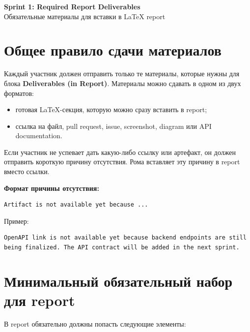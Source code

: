 \documentclass[12pt,a4paper]{article}
\begin{document}

\begin{center}
    {\LARGE \textbf{Sprint 1: Required Report Deliverables}}\\[6pt]
    {\large Обязательные материалы для вставки в LaTeX report}
\end{center}

\section{Общее правило сдачи материалов}

Каждый участник должен отправить только те материалы, которые нужны для блока \textbf{Deliverables (in Report)}.
Материалы можно сдавать в одном из двух форматов:

\begin{itemize}
    \item готовая LaTeX-секция, которую можно сразу вставить в report;
    \item ссылка на файл, pull request, issue, screenshot, diagram или API documentation.
\end{itemize}

Если участник не успевает дать какую-либо ссылку или артефакт, он должен отправить короткую причину отсутствия. Рома вставляет эту причину в report вместо ссылки.

\textbf{Формат причины отсутствия:}

\begin{verbatim}
Artifact is not available yet because ...
\end{verbatim}

Пример:

\begin{verbatim}
OpenAPI link is not available yet because backend endpoints are still
being finalized. The API contract will be added in the next sprint.
\end{verbatim}

\section{Минимальный обязательный набор для report}

В report обязательно должны попасть следующие элементы:
\end{document}
